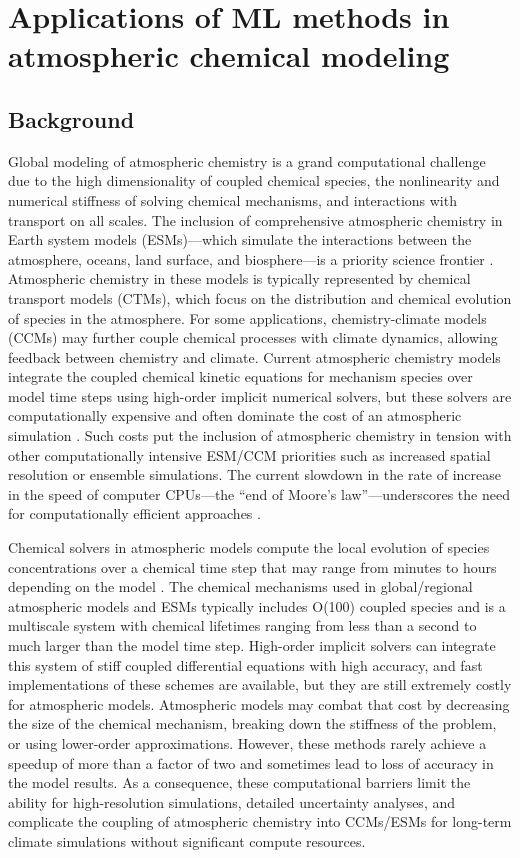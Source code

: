 \documentclass[gmd, manuscript]{copernicus}
\begin{document}
\section{Applications of ML methods in atmospheric chemical modeling}
\subsection{Background}
Global modeling of atmospheric chemistry is a grand computational challenge due to the high dimensionality of coupled chemical species, the nonlinearity and numerical stiffness of solving chemical mechanisms, and interactions with transport on all scales. The inclusion of comprehensive atmospheric chemistry in Earth system models (ESMs)—which simulate the interactions between the atmosphere, oceans, land surface, and biosphere—is a priority science frontier . 
Atmospheric chemistry in these models is typically represented by chemical transport models (CTMs), which focus on the distribution and chemical evolution of species in the atmosphere. For some applications, chemistry-climate models (CCMs) may further couple chemical processes with climate dynamics, allowing feedback between chemistry and climate. Current atmospheric chemistry models integrate the coupled chemical kinetic equations for mechanism species over model time steps using high-order implicit numerical solvers, but these solvers are computationally expensive  and often dominate the cost of an atmospheric simulation . Such costs put the inclusion of atmospheric chemistry in tension with other computationally intensive ESM/CCM priorities such as increased spatial resolution or ensemble simulations. The current slowdown in the rate of increase in the speed of computer CPUs—the “end of Moore's law”—underscores the need for computationally efficient approaches 
.
 
Chemical solvers in atmospheric models compute the local evolution of species concentrations over a chemical time step that may range from minutes to hours depending on the model . The chemical mechanisms used in global/regional atmospheric models and ESMs typically includes O(100) coupled species and is a multiscale system with chemical lifetimes ranging from less than a second to much larger than the model time step. High-order implicit solvers can integrate this system of stiff coupled differential equations with high accuracy, and fast implementations of these schemes are available, but they are still extremely costly for atmospheric models. Atmospheric models may combat that cost by decreasing the size of the chemical mechanism, breaking down the stiffness of the problem, or using lower-order approximations. However, these methods rarely achieve a speedup of more than a factor of two  and sometimes lead to loss of accuracy in the model results. As a consequence, these computational barriers limit the ability for high-resolution simulations, detailed uncertainty analyses, and complicate the coupling of atmospheric chemistry into CCMs/ESMs for long-term climate simulations without significant compute resources. 
 
\end{document}
